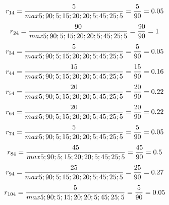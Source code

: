 \begin{enumerate}
\begin{displaymath}
r_{14} = \frac{5}{max {5;90;5;15;20;20;5;45;25;5}} = \frac{5}{90} = 0.05\\
\end {displaymath}
\begin{displaymath}
r_{24} = \frac{90}{max {5;90;5;15;20;20;5;45;25;5}} = \frac{90}{90} = 1\\
\end{displaymath}
\begin{displaymath}
r_{34} = \frac{5}{max {5;90;5;15;20;20;5;45;25;5}} = \frac{5}{90} = 0.05\\
\end {displaymath}
\begin{displaymath}
r_{44} = \frac{15}{max {5;90;5;15;20;20;5;45;25;5}} = \frac{15}{90} = 0.16\\
\end {displaymath}
\begin{displaymath}
r_{54} = \frac{20}{max {5;90;5;15;20;20;5;45;25;5}} = \frac{20}{90} = 0.22\\
\end {displaymath}
\begin{displaymath}
r_{64} = \frac{20}{max {5;90;5;15;20;20;5;45;25;5}} = \frac{20}{90} = 0.22\\
\end {displaymath}
\begin{displaymath}
r_{74} = \frac{5}{max {5;90;5;15;20;20;5;45;25;5}} = \frac{5}{90} = 0.05\\
\end {displaymath}
\begin{displaymath}
r_{84} = \frac{45}{max {5;90;5;15;20;20;5;45;25;5}} = \frac{45}{90} = 0.5\\
\end {displaymath}
\begin{displaymath}
r_{94} = \frac{25}{max {5;90;5;15;20;20;5;45;25;5}} = \frac{25}{90} = 0.27\\
\end {displaymath}
\begin{displaymath}
r_{104} = \frac{5}{max {5;90;5;15;20;20;5;45;25;5}} = \frac{5}{90} = 0.05\\
\end {displaymath}


\end{enumerate}

